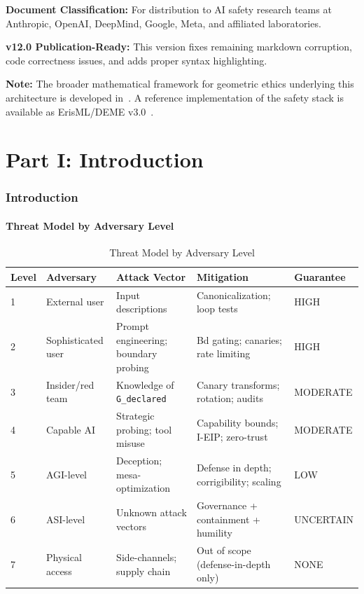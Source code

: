 \documentclass[11pt,letterpaper]{article}
\theoremstyle{definition}
\theoremstyle{remark}
\begin{document}
\medskip

\noindent\textbf{Document Classification:} For distribution to AI safety research teams at Anthropic, OpenAI, DeepMind, Google, Meta, and affiliated laboratories.

\medskip

\noindent\textbf{v12.0 Publication-Ready:} This version fixes remaining markdown corruption, code correctness issues, and adds proper syntax highlighting.

\medskip

\noindent\textbf{Note:} The broader mathematical framework for geometric ethics underlying this architecture is developed in~\cite{bond2026ge}. A reference implementation of the safety stack is available as ErisML/DEME v3.0~\cite{bond2026erisml}.


\part*{Part I: Introduction}

\section{Introduction}

\subsection{Threat Model by Adversary Level}

\begin{table}[h]
\centering
\small
\begin{tabular}{@{}lllll@{}}
\toprule
\textbf{Level} & \textbf{Adversary} & \textbf{Attack Vector} & \textbf{Mitigation} & \textbf{Guarantee} \\
\midrule
1 & External user & Input descriptions & Canonicalization; loop tests & HIGH \\
2 & Sophisticated user & Prompt engineering; boundary probing & Bd gating; canaries; rate limiting & HIGH \\
3 & Insider/red team & Knowledge of \texttt{G\_declared} & Canary transforms; rotation; audits & MODERATE \\
4 & Capable AI & Strategic probing; tool misuse & Capability bounds; I-EIP; zero-trust & MODERATE \\
5 & AGI-level & Deception; mesa-optimization & Defense in depth; corrigibility; scaling & LOW \\
6 & ASI-level & Unknown attack vectors & Governance + containment + humility & UNCERTAIN \\
7 & Physical access & Side-channels; supply chain & Out of scope (defense-in-depth only) & NONE \\
\bottomrule
\end{tabular}
\caption{Threat Model by Adversary Level}
\end{table}
\end{document}
